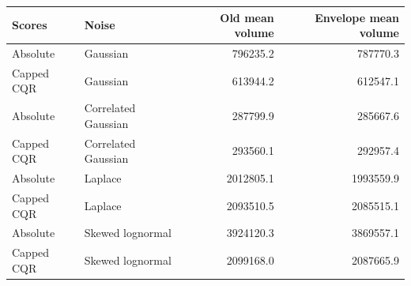 \begin{tabular}{llrr}
\toprule
Scores & Noise & Old mean volume & Envelope mean volume\\
\midrule
Absolute & Gaussian & 796235.2 & 787770.3\\
Capped CQR & Gaussian & 613944.2 & 612547.1\\
Absolute & Correlated Gaussian & 287799.9 & 285667.6\\
Capped CQR & Correlated Gaussian & 293560.1 & 292957.4\\
Absolute & Laplace & 2012805.1 & 1993559.9\\
Capped CQR & Laplace & 2093510.5 & 2085515.1\\
Absolute & Skewed lognormal & 3924120.3 & 3869557.1\\
Capped CQR & Skewed lognormal & 2099168.0 & 2087665.9\\
\bottomrule
\end{tabular}
